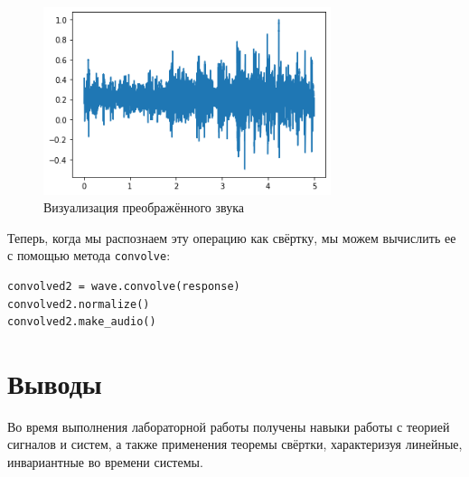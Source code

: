 \documentclass[a4paper,12pt]{report}
\begin{document}
\begin{figure}[H]
        \centering
        \includegraphics[width=0.75\textwidth]{lab10_fig2_6.png}
        \caption{Визуализация преображённого звука}
        \label{fig:lab10_fig2_6}
\end{figure}

Теперь, когда мы распознаем эту операцию как свёртку, мы можем вычислить ее с помощью метода \texttt{convolve}:

\begin{lstlisting}[caption=Моделирование при помощи \texttt{convolve}]
convolved2 = wave.convolve(response)
convolved2.normalize()
convolved2.make_audio()
\end{lstlisting}

\chapter{Выводы}

Во время выполнения лабораторной работы получены навыки работы с теорией сигналов и систем, а также применения теоремы свёртки, характеризуя линейные, инвариантные во времени системы.
\end{document}
